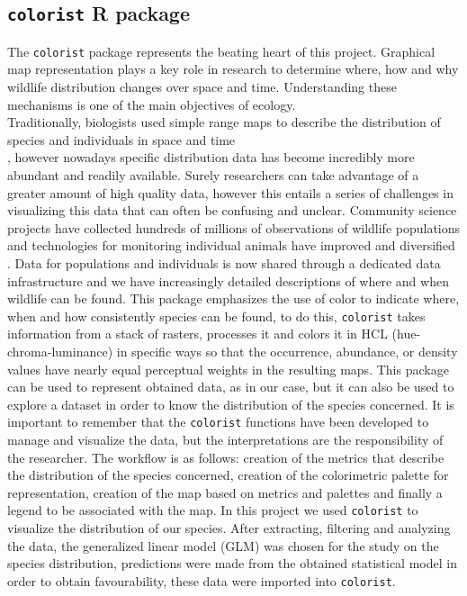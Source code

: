 \documentclass[12pt,a4paper]{article}
\begin{document}
\subsection{\texttt{colorist} R package}
The \texttt{colorist} package represents the beating heart of this project.
Graphical map representation plays a key role in research to determine where, how and why wildlife distribution changes over space and time.\citep{colo}
Understanding these mechanisms is one of the main objectives of ecology.\\\citep{and1}
Traditionally, biologists used simple range maps to describe the distribution of species and individuals in space and time \citep{brt} \\\citep{gri}, however nowadays specific distribution data has become incredibly more abundant and readily available.
Surely researchers can take advantage of a greater amount of high quality data, however this entails a series of challenges in visualizing this data that can often be confusing and unclear.\citep{colo}
Community science projects have collected hundreds of millions of observations of wildlife populations \citep{nat} \citep{sal} and technologies for monitoring individual animals have improved and diversified \citep{ks}. Data for populations and individuals is now shared through a dedicated data infrastructure \citep{gbif} \citep{kra} and we have increasingly detailed descriptions of where and when wildlife can be found.
This package emphasizes the use of color to indicate where, when and how consistently species can be found, to do this, \texttt{colorist} takes information from a stack of rasters, processes it and colors it in HCL (hue-chroma-luminance) in specific ways so that the occurrence, abundance, or density values have nearly equal perceptual weights in the resulting maps. \citep{colo}
This package can be used to represent obtained data, as in our case, but it can also be used to explore a dataset in order to know the distribution of the species concerned.
It is important to remember that the \texttt{colorist} functions have been developed to manage and visualize the data, but the interpretations are the responsibility of the researcher.\citep{colo}
The workflow is as follows: creation of the metrics that describe the distribution of the species concerned, creation of the colorimetric palette for representation, creation of the map based on metrics and palettes and finally a legend to be associated with the map.
In this project we used \texttt{colorist} to visualize the distribution of our species.
After extracting, filtering and analyzing the data, the generalized linear model (GLM) was chosen for the study on the species distribution, predictions were made from the obtained statistical model in order to obtain favourability, these data were imported into \texttt{colorist}.
\end{document}
